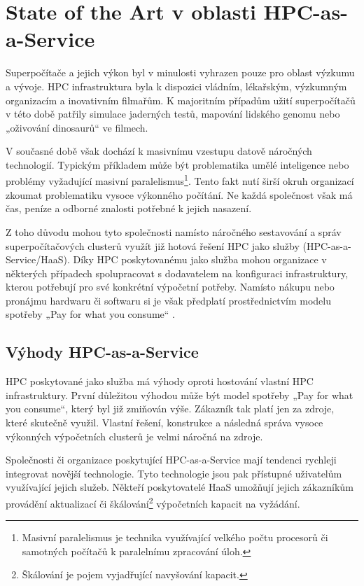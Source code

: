 \chapter{State of the Art v oblasti HPC-as-a-Service}
Superpočítače a jejich výkon byl v minulosti vyhrazen pouze pro oblast výzkumu a vývoje. HPC infrastruktura byla k dispozici vládním, lékařským, výzkumným organizacím a inovativním filmařům. K majoritním případům užití superpočítačů v této době patřily simulace jaderných testů, mapování lidského genomu nebo „oživování dinosaurů“ ve filmech.

V současné době však dochází k masivnímu vzestupu datově náročných technologií. Typickým příkladem může být problematika umělé inteligence nebo problémy vyžadující masivní paralelismus\footnote{Masivní paralelismus je technika využívající velkého počtu procesorů či samotných počítačů k paralelnímu zpracování úloh.}. Tento fakt nutí širší okruh organizací zkoumat problematiku vysoce výkonného počítání. Ne každá společnost však má čas, peníze a odborné znalosti potřebné k jejich nasazení.

Z toho důvodu mohou tyto společnosti namísto náročného sestavování a správ superpočítačových clusterů využít již hotová řešení HPC jako služby (HPC-as-a-Service/HaaS). Díky HPC poskytovanému jako služba mohou organizace v některých případech spolupracovat s dodavatelem na konfiguraci infrastruktury, kterou potřebují pro své konkrétní výpočetní potřeby. Namísto nákupu nebo pronájmu hardwaru či softwaru si je však předplatí prostřednictvím modelu spotřeby „Pay for what you consume“ \cite{Rand20201203}.

\section{Výhody HPC-as-a-Service}
HPC poskytované jako služba má výhody oproti hostování vlastní HPC infrastruktury. První důležitou výhodou může být model spotřeby „Pay for what you consume“, který byl již zmiňován výše. Zákazník tak platí jen za zdroje, které skutečně využil. Vlastní řešení, konstrukce a následná správa vysoce výkonných výpočetních clusterů je velmi náročná na zdroje.

Společnosti či organizace poskytující HPC-as-a-Service mají tendenci rychleji integrovat novější technologie. Tyto technologie jsou pak přístupné uživatelům využívající jejich služeb. Někteří poskytovatelé HaaS umožňují jejich zákazníkům provádění aktualizací či škálování\footnote{Škálování je pojem vyjadřující navyšování kapacit.} výpočetních kapacit na vyžádání. \cite{Wiggers20220120}

